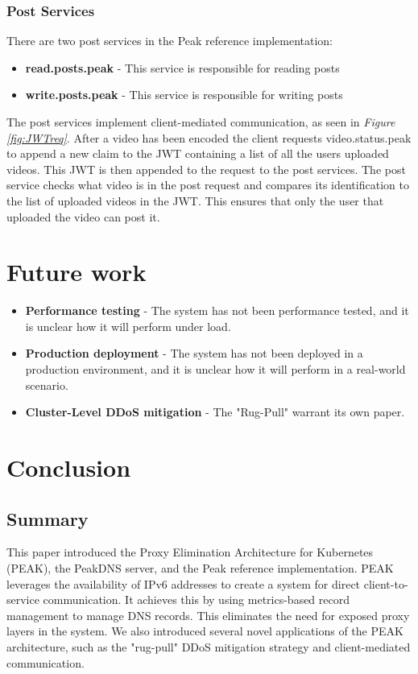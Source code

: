 \documentclass[12pt]{article}
\begin{document}
\subsubsection{Post Services}
There are two post services in the Peak reference implementation:
\begin{itemize}
    \item \textbf{read.posts.peak} - This service is responsible for reading posts
    \item \textbf{write.posts.peak} - This service is responsible for writing posts
\end{itemize}
The post services implement client-mediated communication, as seen in \textit{Figure \ref{fig:JWTreq}}.
After a video has been encoded the client requests video.status.peak to append a new claim to the JWT 
containing a list of all the users uploaded videos. This JWT is then appended to the request to the post services.
The post service checks what video is in the post request and compares its identification to the list of uploaded videos in the JWT.
This ensures that only the user that uploaded the video can post it.

\section{Future work}
\begin{itemize}
    \item \textbf{Performance testing} - The system has not been performance tested, and it is unclear how it will perform under load.
    \item \textbf{Production deployment} - The system has not been deployed in a production environment, and it is unclear how it will perform in a real-world scenario.
    \item \textbf{Cluster-Level DDoS mitigation} - The "Rug-Pull" warrant its own paper.
\end{itemize}

\section{Conclusion}
\subsection{Summary}
This paper introduced the Proxy Elimination Architecture for Kubernetes (PEAK), the PeakDNS server, and the Peak reference implementation.
PEAK leverages the availability of IPv6 addresses to create a system for direct client-to-service communication.
It achieves this by using metrics-based record management to manage DNS records. This eliminates the need for exposed proxy layers in the system.
We also introduced several novel applications of the PEAK architecture, such as the "rug-pull" DDoS mitigation strategy and client-mediated communication.
\end{document}

